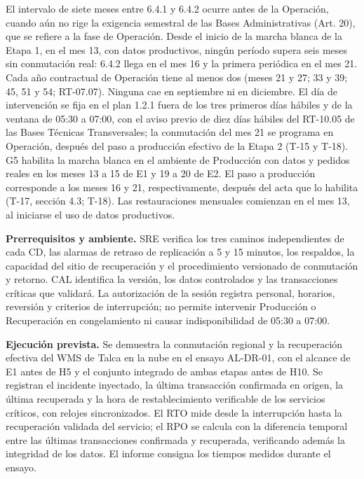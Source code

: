 El intervalo de siete meses entre 6.4.1 y 6.4.2 ocurre antes de la Operación, cuando aún no rige la exigencia semestral de las Bases Administrativas (Art. 20), que se refiere a la fase de Operación. Desde el inicio de la marcha blanca de la Etapa 1, en el mes 13, con datos productivos, ningún período supera seis meses sin conmutación real: 6.4.2 llega en el mes 16 y la primera periódica en el mes 21. Cada año contractual de Operación tiene al menos dos (meses 21 y 27; 33 y 39; 45, 51 y 54; RT-07.07). Ninguna cae en septiembre ni en diciembre. El día de intervención se fija en el plan 1.2.1 fuera de los tres primeros días hábiles y de la ventana de 05:30 a 07:00, con el aviso previo de diez días hábiles del RT-10.05 de las Bases Técnicas Transversales; la conmutación del mes 21 se programa en Operación, después del paso a producción efectivo de la Etapa 2 (T-15 y T-18). G5 habilita la marcha blanca en el ambiente de Producción con datos y pedidos reales en los meses 13 a 15 de E1 y 19 a 20 de E2. El paso a producción corresponde a los meses 16 y 21, respectivamente, después del acta que lo habilita (T-17, sección 4.3; T-18). Las restauraciones mensuales comienzan en el mes 13, al iniciarse el uso de datos productivos.

\textbf{Prerrequisitos y ambiente.} SRE verifica los tres caminos independientes de cada CD, las alarmas de retraso de replicación a 5 y 15 minutos, los respaldos, la capacidad del sitio de recuperación y el procedimiento versionado de conmutación y retorno. CAL identifica la versión, los datos controlados y las transacciones críticas que validará. La autorización de la sesión registra personal, horarios, reversión y criterios de interrupción; no permite intervenir Producción o Recuperación en congelamiento ni causar indisponibilidad de 05:30 a 07:00.

\textbf{Ejecución prevista.} Se demuestra la conmutación regional y la recuperación efectiva del WMS de Talca en la nube en el ensayo AL-DR-01, con el alcance de E1 antes de H5 y el conjunto integrado de ambas etapas antes de H10. Se registran el incidente inyectado, la última transacción confirmada en origen, la última recuperada y la hora de restablecimiento verificable de los servicios críticos, con relojes sincronizados. El RTO mide desde la interrupción hasta la recuperación validada del servicio; el RPO se calcula con la diferencia temporal entre las últimas transacciones confirmada y recuperada, verificando además la integridad de los datos. El informe consigna los tiempos medidos durante el ensayo.

